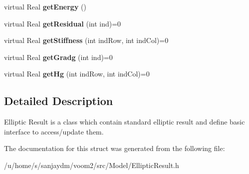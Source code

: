 \begin{DoxyCompactItemize}
\item 
\hypertarget{structvoom_1_1_elliptic_result_aefec9b543f8f5f93f5227a4f4155eb4b}{
virtual Real {\bfseries getEnergy} ()}
\label{structvoom_1_1_elliptic_result_aefec9b543f8f5f93f5227a4f4155eb4b}

\item 
\hypertarget{structvoom_1_1_elliptic_result_a9e66fe4e4c59393074ffa5c62971e494}{
virtual Real {\bfseries getResidual} (int ind)=0}
\label{structvoom_1_1_elliptic_result_a9e66fe4e4c59393074ffa5c62971e494}

\item 
\hypertarget{structvoom_1_1_elliptic_result_a550064e0b125ccf044e50b434224ea64}{
virtual Real {\bfseries getStiffness} (int indRow, int indCol)=0}
\label{structvoom_1_1_elliptic_result_a550064e0b125ccf044e50b434224ea64}

\item 
\hypertarget{structvoom_1_1_elliptic_result_a01fa418b925834e4c736368320930e02}{
virtual Real {\bfseries getGradg} (int ind)=0}
\label{structvoom_1_1_elliptic_result_a01fa418b925834e4c736368320930e02}

\item 
\hypertarget{structvoom_1_1_elliptic_result_ab1a31fbdf0d66a183c6dad36a48efa12}{
virtual Real {\bfseries getHg} (int indRow, int indCol)=0}
\label{structvoom_1_1_elliptic_result_ab1a31fbdf0d66a183c6dad36a48efa12}

\end{DoxyCompactItemize}


\subsection{Detailed Description}
Elliptic Result is a class which contain standard elliptic result and define basic interface to access/update them. 

The documentation for this struct was generated from the following file:\begin{DoxyCompactItemize}
\item 
/u/home/s/sanjaydm/voom2/src/Model/EllipticResult.h\end{DoxyCompactItemize}
